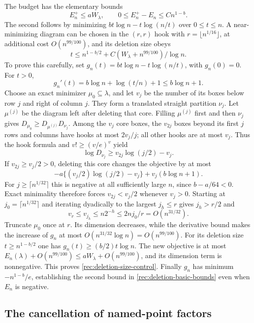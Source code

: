 The budget has the elementary bounds
\begin{equation}\label{rec:deletion-basic-bounds}
 E_n^+\le aW_\lambda,\qquad
 0\le E_n^+-E_n\le Cn^{1-b}.
\end{equation}
The second follows by minimizing $bt\log n-t\log(n/t)$ over
$0\le t\le n$.  A near-minimizing diagram can be chosen in the
$(r,r)$ hook with $r=\lfloor n^{1/16}\rfloor$, at additional cost
$O(n^{99/100})$, and its deletion size obeys
\begin{equation}\label{rec:deletion-size-control}
 t\le n^{1-b/2}+C(W_\lambda+n^{99/100})/\log n.
\end{equation}
To prove this carefully, set $g_n(t)=bt\log n-t\log(n/t)$,
with $g_n(0)=0$. For $t>0$,
\[
 g_n'(t)=b\log n+\log(t/n)+1\le b\log n+1.
\]
Choose an exact minimizer $\mu_0\subseteq\lambda$, and let $v_j$
be the number of its boxes below row $j$ and right of column $j$.
They form a translated straight partition $\nu_j$. Let $\mu^{(j)}$
be the diagram left after deleting that core. Filling $\mu^{(j)}$
first and then $\nu_j$ gives
$D_{\mu_0}\ge D_{\mu^{(j)}}D_{\nu_j}$.
Among the $v_j$ core boxes, the $v_{2j}$ boxes beyond its first $j$
rows and columns have hooks at most $2v_j/j$; all other hooks are at
most $v_j$. Thus the hook formula and $v!\ge(v/e)^v$ yield
\[
 \log D_{\nu_j}\ge v_{2j}\log(j/2)-v_j.
\]
If $v_{2j}\ge v_j/2>0$, deleting this core changes the objective by
at most
\[
 -a\{(v_j/2)\log(j/2)-v_j\}+v_j(b\log n+1).
\]
For $j\ge\lceil n^{1/32}\rceil$ this is negative at all sufficiently
large $n$, since $b-a/64<0$. Exact minimality therefore forces
$v_{2j}<v_j/2$ whenever $v_j>0$. Starting at
$j_0=\lceil n^{1/32}\rceil$ and iterating dyadically to the largest
$j_h\le r$ gives $j_h>r/2$ and
\[
 v_r\le v_{j_h}\le n2^{-h}\le2nj_0/r=O(n^{31/32}).
\]
Truncate $\mu_0$ once at $r$. Its dimension decreases, while the
derivative bound makes the increase of $g_n$ at most
$O(n^{31/32}\log n)=O(n^{99/100})$.
For its deletion size $t\ge n^{1-b/2}$ one has
$g_n(t)\ge(b/2)t\log n$. The new objective is at most
$E_n(\lambda)+O(n^{99/100})\le aW_\lambda+O(n^{99/100})$,
and its dimension term is nonnegative. This proves
\eqref{rec:deletion-size-control}. Finally $g_n$ has minimum
$-n^{1-b}/e$, establishing the second bound in
\eqref{rec:deletion-basic-bounds} even when $E_n$ is negative.

\subsection{The cancellation of named-point factors}

